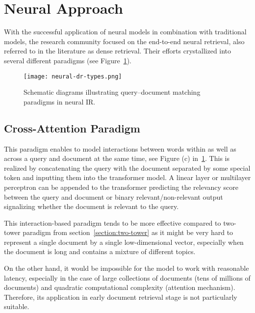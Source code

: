 \section{Neural Approach}
\label{chapter:neural-approach}
    With the successful application of neural models in combination with traditional models, the research community focused on the end-to-end neural retrieval, also referred to in the literature as dense retrieval.
    Their efforts crystallized into several different paradigms (see Figure~\ref{fig:neural-approach-paradigms}).
    \begin{figure}[H]
        \texttt{[image: neural-dr-types.png]}
        \centering
        \caption[Query–document matching paradigms in neural IR]{Schematic diagrams illustrating query–document matching paradigms in neural IR.~\parencite{colbert_2020}}
        \label{fig:neural-approach-paradigms}
    \end{figure}


\subsection{Cross-Attention Paradigm}
\label{section:cross-attention}
    This paradigm enables to model interactions between words within as well as across a query and document at the same time, see Figure (c) in~\ref{fig:neural-approach-paradigms}. This is realized by concatenating the query with the document separated by some special token and inputting them into the transformer model. A linear layer or multilayer perceptron can be appended to the transformer predicting the relevancy score between the query and document or binary relevant/non-relevant output signalizing whether the document is relevant to the query.
    
    This interaction-based paradigm tends to be more effective compared to two-tower paradigm from section~\ref{section:two-tower} as it might be very hard to represent a single document by a single low-dimensional vector, especially when the document is long and contains a mixture of different topics.~\parencite{mitra-intro-to-ir}
    
    On the other hand, it would be impossible for the model to work with reasonable latency, especially in the case of large collections of documents (tens of millions of documents) and quadratic computational complexity (attention mechanism). Therefore, its application in early document retrieval stage is not particularly suitable.
    


